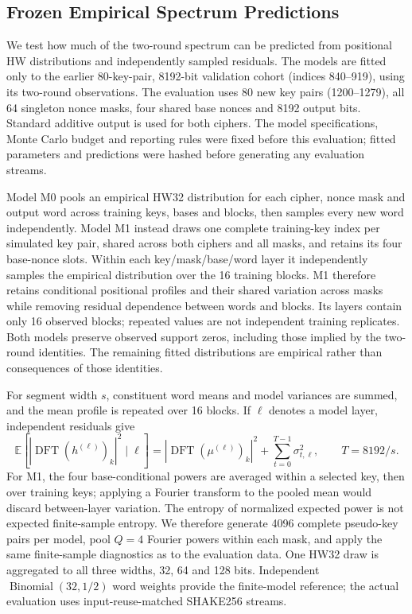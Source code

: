 \subsection{Frozen Empirical Spectrum Predictions}\label{sec:spectralpredictionmethods}

We test how much of the two-round spectrum can be predicted from positional HW distributions and independently sampled residuals. The models are fitted only to the earlier 80-key-pair, 8192-bit validation cohort (indices 840--919), using its two-round observations. The evaluation uses 80 new key pairs (1200--1279), all 64 singleton nonce masks, four shared base nonces and 8192 output bits. Standard additive output is used for both ciphers. The model specifications, Monte Carlo budget and reporting rules were fixed before this evaluation; fitted parameters and predictions were hashed before generating any evaluation streams.

Model M0 pools an empirical HW32 distribution for each cipher, nonce mask and output word across training keys, bases and blocks, then samples every new word independently. Model M1 instead draws one complete training-key index per simulated key pair, shared across both ciphers and all masks, and retains its four base-nonce slots. Within each key/mask/base/word layer it independently samples the empirical distribution over the 16 training blocks. M1 therefore retains conditional positional profiles and their shared variation across masks while removing residual dependence between words and blocks. Its layers contain only 16 observed blocks; repeated values are not independent training replicates. Both models preserve observed support zeros, including those implied by the two-round identities. The remaining fitted distributions are empirical rather than consequences of those identities.

For segment width $s$, constituent word means and model variances are summed, and the mean profile is repeated over 16 blocks. If $\ell$ denotes a model layer, independent residuals give
\begin{equation}
 \mathbb{E}\!\left[\left|\operatorname{DFT}(h^{(\ell)})_k\right|^2\mid\ell\right]
 =\left|\operatorname{DFT}(\mu^{(\ell)})_k\right|^2
  +\sum_{t=0}^{T-1}\sigma_{t,\ell}^{2},\qquad T=8192/s.
 \label{eq:predictedpower}
\end{equation}
For M1, the four base-conditional powers are averaged within a selected key, then over training keys; applying a Fourier transform to the pooled mean would discard between-layer variation. The entropy of normalized expected power is not expected finite-sample entropy. We therefore generate 4096 complete pseudo-key pairs per model, pool $Q=4$ Fourier powers within each mask, and apply the same finite-sample diagnostics as to the evaluation data. One HW32 draw is aggregated to all three widths, 32, 64 and 128 bits. Independent $\operatorname{Binomial}(32,1/2)$ word weights provide the finite-model reference; the actual evaluation uses input-reuse-matched SHAKE256 streams.

